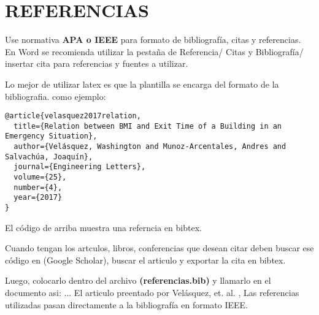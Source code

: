 \chapter{REFERENCIAS}
\thispagestyle{empty}

Use normativa \textbf{APA o IEEE} para formato de bibliografía, citas y referencias. 
En Word se recomienda utilizar la pestaña de Referencia/ Citas y Bibliografía/ insertar cita para referencias y fuentes a utilizar.

Lo mejor de utilizar latex es que la plantilla se encarga del formato de la bibliografia. como ejemplo: 

\begin{lstlisting}
@article{velasquez2017relation,
  title={Relation between BMI and Exit Time of a Building in an Emergency Situation},
  author={Velásquez, Washington and Munoz-Arcentales, Andres and Salvachúa, Joaquín},
  journal={Engineering Letters},
  volume={25},
  number={4},
  year={2017}
}
\end{lstlisting}

El código de arriba muestra una referncia en bibtex. 

Cuando tengan los artculos, libros, conferencias que desean citar deben buscar ese código en (Google Scholar), buscar el articulo y exportar la cita en bibtex. 

Luego, colocarlo dentro del archivo \textbf{(referencias.bib)} y llamarlo en el documento asi: ... El articulo preentado por Velásquez, et. al. \cite{velasquez2017relation}, Las referencias utilizadas pasan directamente a la bibliografía en formato IEEE. 
